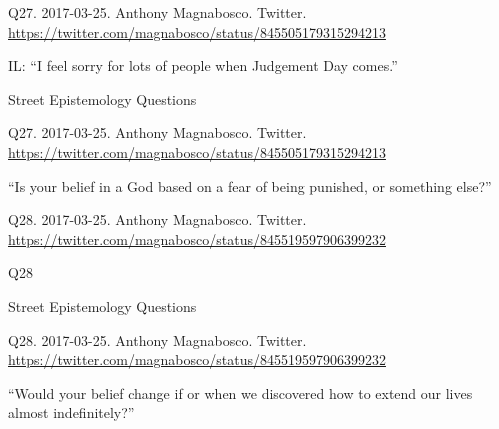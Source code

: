 \documentclass[
    src/templates/5x2-on-a4paper,
    frame
]{flashcards}
\newcommand{\myheader}{}
\newcommand{\myfooter}{
    \begin{flushright}
        \small\sc
        Street Epistemology Questions \par
    \end{flushright}
}
\begin{document}
        \renewcommand{\myheader}{
            \normalfont %
            \begin{tiny}
                Q27.
                2017-03-25.
                Anthony Magnabosco.
                    Twitter.
                    \\
                    \url{ https://twitter.com/magnabosco/status/845505179315294213 }
                \par
            \end{tiny}
        }
        \begin{flashcard}{
            \myheader
            \vspace{\fill}
            \begin{center}
                \large
                    IL: \enquote{I feel sorry for lots of people when Judgement Day comes.}                    %
            \end{center}
            \vspace{\fill}
            \myfooter
            \vspace{-1.4ex}
        }
            \myheader
            \vspace{\fill}
            \begin{center}
                \large
\enquote{Is your belief in a God based on a fear of being punished, or something else?}            \end{center}
            \vspace{\fill}
        \end{flashcard}
        \renewcommand{\myheader}{
            \normalfont %
            \begin{tiny}
                Q28.
                2017-03-25.
                Anthony Magnabosco.
                    Twitter.
                    \\
                    \url{ https://twitter.com/magnabosco/status/845519597906399232 }
                \par
            \end{tiny}
        }
        \begin{flashcard}{
            \myheader
            \vspace{\fill}
            \begin{center}
                \large
                    Q28
            \end{center}
            \vspace{\fill}
            \myfooter
            \vspace{-1.4ex}
        }
            \myheader
            \vspace{\fill}
            \begin{center}
                \large
\enquote{Would your belief change if or when we discovered how to extend our lives almost indefinitely?}            \end{center}
            \vspace{\fill}
        \end{flashcard}
\end{document}
